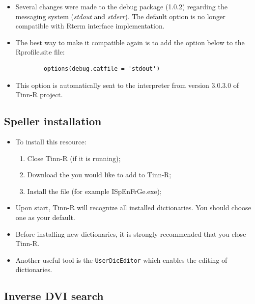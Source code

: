 \begin{itemize}
  \item Several changes were made to the debug package (1.0.2) regarding
    the messaging system (\textit{stdout} and \textit{stderr}). The
    default option is no longer compatible with Rterm interface
    implementation.
  \item The best way to make it compatible again is to add the option
    below to the Rprofile.site file:

    \begin{footnotesize}
      \begin{verbatim}
        options(debug.catfile = 'stdout')
      \end{verbatim}
    \end{footnotesize}

   \item This option is automatically sent to the \RR{} interpreter from version 3.0.3.0 of Tinn-R project.
\end{itemize}


\hypertarget{configuration_spellerinstalation}{}
\subsection{Speller installation}

\begin{itemize}
  \item To install this resource:
    \begin{enumerate}
      \item Close Tinn-R (if it is running);
      \item Download the
        you would like to add to Tinn-R;
      \item Install the file (for example ISpEnFrGe.exe);
    \end{enumerate}
  \item Upon start, Tinn-R will recognize all installed dictionaries.
    You should choose one as your default.
  \item Before installing new dictionaries, it is strongly
    recommended that you close Tinn-R.
  \item Another useful tool is the \texttt{UserDicEditor} which
    enables the editing of dictionaries.
\end{itemize}


\subsection{Inverse DVI search}

